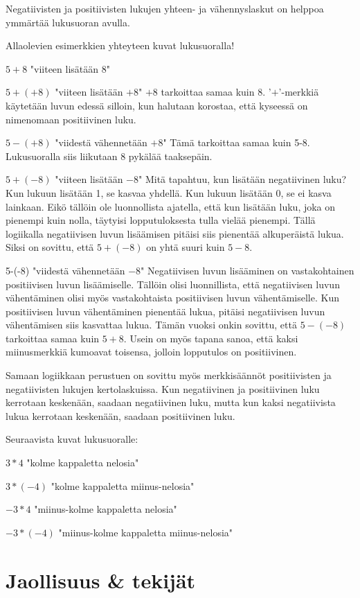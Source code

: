 Negatiivisten ja positiivisten lukujen yhteen- ja vähennyslaskut on helppoa ymmärtää lukusuoran avulla.

Allaolevien esimerkkien yhteyteen kuvat lukusuoralla!

$5+8$ "viiteen lisätään $8$"

$5+(+8)$ "viiteen lisätään $+8$" $+8$ tarkoittaa samaa kuin $8$. '$+$'-merkkiä käytetään luvun edessä silloin, kun halutaan korostaa, että kyseessä on nimenomaan positiivinen luku.

$5-(+8)$ "viidestä vähennetään $+8$" Tämä tarkoittaa samaa kuin 5-8. Lukusuoralla siis liikutaan 8 pykälää taaksepäin.

$5+(-8)$ "viiteen lisätään $-8$" Mitä tapahtuu, kun lisätään negatiivinen luku? Kun lukuun lisätään 1, se kasvaa yhdellä. Kun lukuun lisätään 0, se ei kasva lainkaan. Eikö tällöin ole luonnollista ajatella, että kun lisätään luku, joka on pienempi kuin nolla, täytyisi lopputuloksesta tulla vielää pienempi. Tällä logiikalla negatiivisen luvun lisäämisen pitäisi siis pienentää alkuperäistä lukua. Siksi on sovittu, että $5+(-8)$ on yhtä suuri kuin $5-8$.

5-(-8) "viidestä vähennetään $-8$" Negatiivisen luvun lisääminen on vastakohtainen positiivisen luvun lisäämiselle. Tällöin olisi luonnillista, että negatiivisen luvun vähentäminen olisi myös vastakohtaista positiivisen luvun vähentämiselle. Kun positiivisen luvun vähentäminen pienentää lukua, pitäisi negatiivisen luvun vähentämisen siis kasvattaa lukua. Tämän vuoksi onkin sovittu, että $5-(-8)$ tarkoittaa samaa kuin $5+8$. Usein on myös tapana sanoa, että kaksi miinusmerkkiä kumoavat toisensa, jolloin lopputulos on positiivinen.

Samaan logiikkaan perustuen on sovittu myös merkkisäännöt positiivisten ja negatiivisten lukujen kertolaskuissa. Kun negatiivinen ja positiivinen luku kerrotaan keskenään, saadaan negatiivinen luku, mutta kun kaksi negatiivista lukua kerrotaan keskenään, saadaan positiivinen luku.

Seuraavista kuvat lukusuoralle:

$3*4$ "kolme kappaletta nelosia"

$3*(-4)$ "kolme kappaletta miinus-nelosia"

$-3*4$ "miinus-kolme kappaletta nelosia"

$-3*(-4)$ "miinus-kolme kappaletta miinus-nelosia"

\chapter{Jaollisuus \& tekijät}
